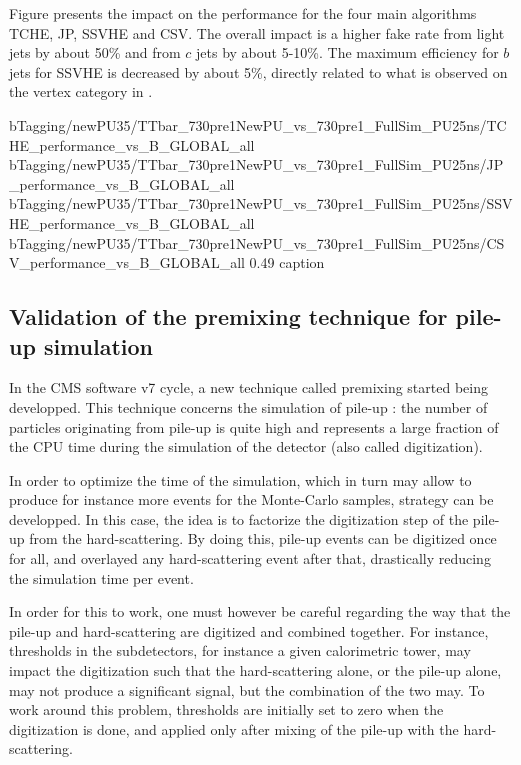         Figure  presents the impact on the performance
        for the four main algorithms TCHE, JP, SSVHE and CSV. The overall impact is a higher
        fake rate from light jets by about 50\% and from $c$ jets by about 5-10\%. The
        maximum efficiency for $b$ jets for SSVHE is decreased by about 5\%, directly
        related to what is observed on the vertex category in .

                          {bTagging/newPU35/TTbar_730pre1NewPU_vs_730pre1_FullSim_PU25ns/TCHE_performance_vs_B_GLOBAL_all}
                          {bTagging/newPU35/TTbar_730pre1NewPU_vs_730pre1_FullSim_PU25ns/JP_performance_vs_B_GLOBAL_all}
                          {bTagging/newPU35/TTbar_730pre1NewPU_vs_730pre1_FullSim_PU25ns/SSVHE_performance_vs_B_GLOBAL_all}
                          {bTagging/newPU35/TTbar_730pre1NewPU_vs_730pre1_FullSim_PU25ns/CSV_performance_vs_B_GLOBAL_all}
                          {0.49}
                          {caption}

        \subsection{Validation of the premixing technique for pile-up simulation}

        In the CMS software v7 cycle, a new technique called premixing started being developped.
        This technique concerns the simulation of pile-up : the number of particles
        originating from pile-up is quite high and represents a large fraction of the CPU time
        during the simulation of the detector (also called digitization).

        In order to optimize
        the time of the simulation, which in turn may allow to produce for instance more events
        for the Monte-Carlo samples, strategy can be developped. In this case, the idea
        is to factorize the digitization step of the pile-up from the hard-scattering.
        By doing this, pile-up events can be digitized once for all, and overlayed
        any hard-scattering event after that, drastically reducing the simulation time
        per event.

        In order for this to work, one must however be careful regarding the way that the
        pile-up and hard-scattering are digitized and combined together. For instance,
        thresholds in the subdetectors, for instance a given calorimetric tower, may
        impact the digitization such that the hard-scattering alone, or the pile-up alone,
        may not produce a significant signal, but the combination of the two may. To
        work around this problem, thresholds are initially set to zero when the digitization
        is done, and applied only after mixing of the pile-up with the hard-scattering.

